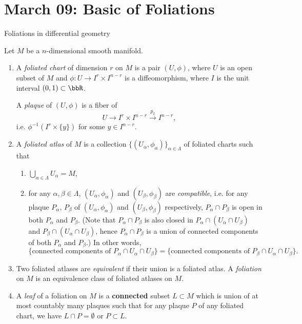 \section{March 09: Basic of Foliations}

Foliations in differential geometry

\begin{definition}
  Let $M$ be a $n$-dimensional smooth manifold. 

  \begin{enumerate}
    \item A \emph{foliated chart} of dimension $r$ on $M$ is a pair $(U, \phi)$, where $U$ is an open subset of $M$ and $\phi: U \to I^r \times I^{n-r}$ is a diffeomorphism, where $I$ is the unit interval $(0, 1) \subset \bbR$.

      A \emph{plaque} of $(U, \phi)$ is a fiber of 
      \[ U \to I^r \times I^{n-r}  \xrightarrow{p_2} I^{n-r}, \]
      i.e. $\phi^{-1}(I^r \times \{y\})$ for some $y \in I^{n-r}$.

    \item A \emph{foliated atlas} of $M$ is a collection $\{(U_\alpha, \phi_\alpha)\}_{\alpha \in \Lambda}$ of foliated charts such that 
      \begin{enumerate}
        \item $\bigcup_{\alpha \in \Lambda} U_\alpha = M$,
        \item for any $\alpha, \beta \in \Lambda$, $(U_\alpha,\phi_\alpha)$ and $(U_\beta, \phi_\beta)$ are \emph{compatible}, i.e. for any plaque $P_\alpha$, $P_\beta$ of $(U_\alpha, \phi_\alpha)$ and $(U_\beta, \phi_\beta)$ respectively, $P_\alpha \cap P_\beta$ is open in both $P_\alpha$ and $P_\beta$. 
          (Note that $P_\alpha \cap P_\beta$ is also closed in $P_\alpha \cap (U_\alpha \cap U_\beta)$ and $P_\beta \cap (U_\alpha \cap U_\beta)$, hence $P_\alpha \cap P_\beta$ is a union of connected components of both $P_\alpha$ and $P_\beta$.) 
          In other words, 
            \[ \{\text{connected components of } P_\alpha \cap U_\alpha \cap U_\beta\} = \{\text{connected components of } P_\beta \cap U_\alpha \cap U_\beta\}. \]
      \end{enumerate}

    \item Two foliated atlases are \emph{equivalent} if their union is a foliated atlas. 
      A \emph{foliation} on $M$ is an equivalence class of foliated atlases on $M$.

    \item A \emph{leaf} of a foliation on $M$ is a \textbf{connected} subset $L \subset M$ which is union of at most countably many plaques such that for any plaque $P$ of any foliated chart, we have $L \cap P = \emptyset$ or $P \subset L$.
  \end{enumerate}
\end{definition}

